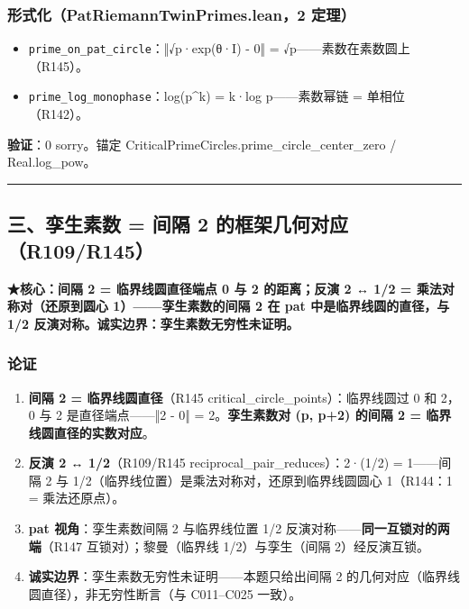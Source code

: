 \documentclass[
]{article}
\providecommand{\tightlist}{%
 \setlength{\itemsep}{0pt}\setlength{\parskip}{0pt}}
\begin{document}
\subsubsection{形式化（PatRiemannTwinPrimes.lean，2
定理）}\label{ux5f62ux5f0fux5316patriemanntwinprimes.lean2-ux5b9aux7406-1}

\begin{itemize}
\tightlist
\item
 \texttt{prime\_on\_pat\_circle}：‖√p·exp(θ·I) - 0‖ =
 √p------素数在素数圆上（R145）。
\item
 \texttt{prime\_log\_monophase}：log(p\^{}k) = k·log p------素数幂链 =
 单相位（R142）。
\end{itemize}

\textbf{验证}：0 sorry。锚定
CriticalPrimeCircles.prime\_circle\_center\_zero / Real.log\_pow。

\begin{center}\rule{0.5\linewidth}{0.5pt}\end{center}

\subsection{三、孪生素数 = 间隔 2
的框架几何对应（R109/R145）}\label{ux4e09ux5b6aux751fux7d20ux6570-ux95f4ux9694-2-ux7684ux6846ux67b6ux51e0ux4f55ux5bf9ux5e94r109r145}

\textbf{★核心：间隔 2 = 临界线圆直径端点 0 与 2 的距离；反演 2 ↔ 1/2 =
乘法对称对（还原到圆心 1）------孪生素数的间隔 2 在 pat
中是临界线圆的直径，与 1/2 反演对称。诚实边界：孪生素数无穷性未证明。}

\subsubsection{论证}\label{ux8bbaux8bc1-2}

\begin{enumerate}
\def\labelenumi{\arabic{enumi}.}
\tightlist
\item
 \textbf{间隔 2 = 临界线圆直径}（R145
 critical\_circle\_points）：临界线圆过 0 和 2，0 与 2
 是直径端点------‖2 - 0‖ = 2。\textbf{孪生素数对 (p, p+2) 的间隔 2 =
 临界线圆直径的实数对应}。
\item
 \textbf{反演 2 ↔ 1/2}（R109/R145 reciprocal\_pair\_reduces）：2·(1/2)
 = 1------间隔 2 与 1/2（临界线位置）是乘法对称对，还原到临界线圆圆心
 1（R144：1 = 乘法还原点）。
\item
 \textbf{pat 视角}：孪生素数间隔 2 与临界线位置 1/2
 反演对称------\textbf{同一互锁对的两端}（R147 互锁对）；黎曼（临界线
 1/2）与孪生（间隔 2）经反演互锁。
\item
 \textbf{诚实边界}：孪生素数无穷性未证明------本题只给出间隔 2
 的几何对应（临界线圆直径），非无穷性断言（与 C011--C025 一致）。
\end{enumerate}
\end{document}

